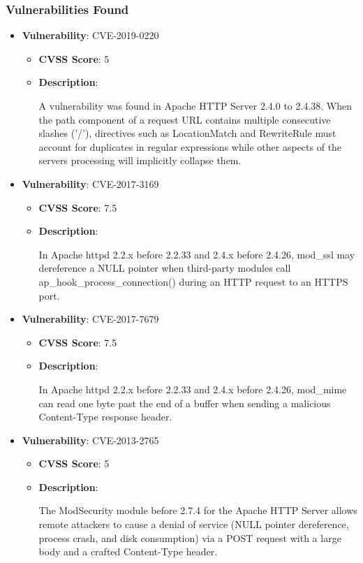 \documentclass{article}
\begin{document}
\subsubsection*{Vulnerabilities Found}

\begin{itemize}
    
        \item \textbf{Vulnerability}: CVE-2019-0220
        \begin{itemize}
            \item \textbf{CVSS Score}:  5 
            \item \textbf{Description}:
            \parbox[t]{0.9\linewidth}{
                \ttfamily A vulnerability was found in Apache HTTP Server 2.4.0 to 2.4.38. When the path component of a request URL contains multiple consecutive slashes ('/'), directives such as LocationMatch and RewriteRule must account for duplicates in regular expressions while other aspects of the servers processing will implicitly collapse them.
            }
        \end{itemize}
    
        \item \textbf{Vulnerability}: CVE-2017-3169
        \begin{itemize}
            \item \textbf{CVSS Score}:  7.5 
            \item \textbf{Description}:
            \parbox[t]{0.9\linewidth}{
                \ttfamily In Apache httpd 2.2.x before 2.2.33 and 2.4.x before 2.4.26, mod\_ssl may dereference a NULL pointer when third-party modules call ap\_hook\_process\_connection() during an HTTP request to an HTTPS port.
            }
        \end{itemize}
    
        \item \textbf{Vulnerability}: CVE-2017-7679
        \begin{itemize}
            \item \textbf{CVSS Score}:  7.5 
            \item \textbf{Description}:
            \parbox[t]{0.9\linewidth}{
                \ttfamily In Apache httpd 2.2.x before 2.2.33 and 2.4.x before 2.4.26, mod\_mime can read one byte past the end of a buffer when sending a malicious Content-Type response header.
            }
        \end{itemize}
    
        \item \textbf{Vulnerability}: CVE-2013-2765
        \begin{itemize}
            \item \textbf{CVSS Score}:  5 
            \item \textbf{Description}:
            \parbox[t]{0.9\linewidth}{
                \ttfamily The ModSecurity module before 2.7.4 for the Apache HTTP Server allows remote attackers to cause a denial of service (NULL pointer dereference, process crash, and disk consumption) via a POST request with a large body and a crafted Content-Type header.
            }
        \end{itemize}
    

\end{itemize}
\end{document}
